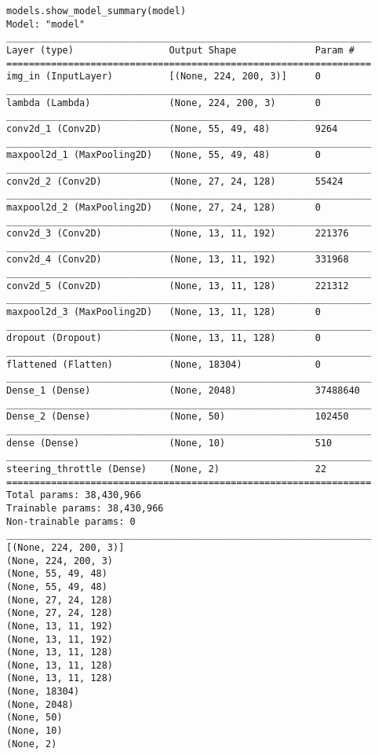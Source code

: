 \begin{verbatim}
models.show_model_summary(model)
Model: "model"
_________________________________________________________________
Layer (type)                 Output Shape              Param #   
=================================================================
img_in (InputLayer)          [(None, 224, 200, 3)]     0         
_________________________________________________________________
lambda (Lambda)              (None, 224, 200, 3)       0         
_________________________________________________________________
conv2d_1 (Conv2D)            (None, 55, 49, 48)        9264      
_________________________________________________________________
maxpool2d_1 (MaxPooling2D)   (None, 55, 49, 48)        0         
_________________________________________________________________
conv2d_2 (Conv2D)            (None, 27, 24, 128)       55424     
_________________________________________________________________
maxpool2d_2 (MaxPooling2D)   (None, 27, 24, 128)       0         
_________________________________________________________________
conv2d_3 (Conv2D)            (None, 13, 11, 192)       221376    
_________________________________________________________________
conv2d_4 (Conv2D)            (None, 13, 11, 192)       331968    
_________________________________________________________________
conv2d_5 (Conv2D)            (None, 13, 11, 128)       221312    
_________________________________________________________________
maxpool2d_3 (MaxPooling2D)   (None, 13, 11, 128)       0         
_________________________________________________________________
dropout (Dropout)            (None, 13, 11, 128)       0         
_________________________________________________________________
flattened (Flatten)          (None, 18304)             0         
_________________________________________________________________
Dense_1 (Dense)              (None, 2048)              37488640  
_________________________________________________________________
Dense_2 (Dense)              (None, 50)                102450    
_________________________________________________________________
dense (Dense)                (None, 10)                510       
_________________________________________________________________
steering_throttle (Dense)    (None, 2)                 22        
=================================================================
Total params: 38,430,966
Trainable params: 38,430,966
Non-trainable params: 0
_________________________________________________________________
[(None, 224, 200, 3)]
(None, 224, 200, 3)
(None, 55, 49, 48)
(None, 55, 49, 48)
(None, 27, 24, 128)
(None, 27, 24, 128)
(None, 13, 11, 192)
(None, 13, 11, 192)
(None, 13, 11, 128)
(None, 13, 11, 128)
(None, 13, 11, 128)
(None, 18304)
(None, 2048)
(None, 50)
(None, 10)
(None, 2)
\end{verbatim}

